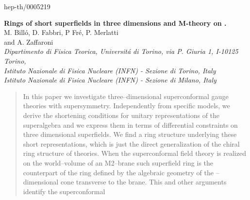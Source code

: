\documentclass[a4paper,12pt]{article}
\def\n010{N^{0,1,0}}
\begin{document}
\begin{titlepage}
\begin{flushright}
hep-th/0005219 \\
\end{flushright}
\vskip 2cm
\begin{center}
{{\Large \bf
Rings of short \coordHE{} superfields in three dimensions
and M-theory on \myHighlight{$AdS_4\times \n010$}\coordHE{}. \hskip 0.2cm \myHighlight{$^\dagger$}\coordHE{}
}}\\
\vfill
{\large M. Bill\'o\coordHE{}, D. Fabbri\coordHE{},  P Fr\'e\coordHE{}, P. Merlatti\coordHE{}\\
and A. Zaffaroni\coordHE{}} \\
\vfill
{ \sl {}\coordHE{} Dipartimento di Fisica Teorica, Universit\'a di Torino, via P.
Giuria 1,
I-10125 Torino, \\
 Istituto Nazionale di Fisica Nucleare (INFN) - Sezione di Torino,
Italy \\
\coordHE{} Istituto Nazionale di Fisica Nucleare (INFN) - Sezione di Milano,
Italy }
\end{center}
\vfill
\begin{abstract}
{In this paper we investigate three--dimensional superconformal
gauge theories with \coordHE{} supersymmetry.
Independently from specific models, we derive the shortening
conditions for unitary representations of the \coordHE{}
superalgebra and we express them in terms of differential
constraints on three dimensional \coordHE{} superfields.
We find a ring structure underlying these short representations,
which is just the direct generalization of the chiral ring structure
of \coordHE{} theories.
When the superconformal field theory is realized on the world--volume
of an M2--brane such superfield ring is the counterpart of the ring
defined by the algebraic geometry of the \coordHE{}--dimensional cone
transverse to the brane.
This and other arguments identify the \coordHE{} superconformal
}
\end{abstract}
\end{titlepage}
\end{document}
